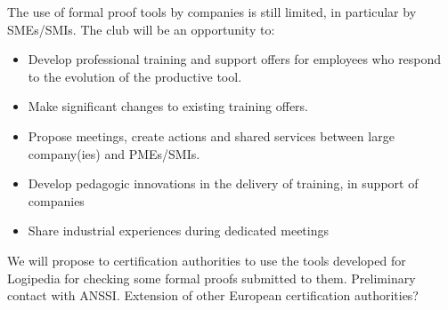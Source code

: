 \begin{workpackage}[id=dissemination,type=MGT,
  short={Dissemination, communication and exploitation},
  title={Dissemination, communication and exploitation},
  lead=Inr]
\begin{tasklist}
  \begin{task}[id=industrial-club,
    title=Expanding the use of Logipedia in the industry,
    lead=Irt,IrtRM=2,wphases=7-42!.1]
    The use of formal proof tools by companies is still limited, in particular by SMEs/SMIs. The club will be an opportunity to:
    \begin{itemize}
    \item Develop professional training and support offers for employees who respond to the evolution of the productive tool.
    \item Make significant changes to existing training offers.
    \item Propose meetings, create actions and shared services between large company(ies) and PMEs/SMIs.
    \item Develop pedagogic innovations in the delivery of training, in support of companies
    \item Share industrial experiences during dedicated meetings
    \end{itemize}
  \end{task}



  \begin{task}[id=certif-club,
      title=Expanding the use of Logipedia within certification authorities,
      lead=Imt,ImtRM=2,wphases=7-42!.05]
    We will propose to certification authorities to use the tools
    developed for Logipedia for checking some formal proofs submitted
    to them. Preliminary contact with ANSSI. Extension of other
    European certification authorities?
  \end{task}


\end{tasklist}
\end{workpackage}
